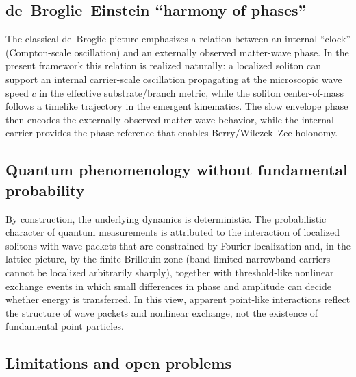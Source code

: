 \subsection{de~Broglie--Einstein ``harmony of phases''}

The classical de~Broglie picture emphasizes a relation between an internal ``clock'' (Compton-scale oscillation)
and an externally observed matter-wave phase.
In the present framework this relation is realized naturally: a localized soliton can support an internal carrier-scale
oscillation propagating at the microscopic wave speed $c$ in the effective substrate/branch metric, while the soliton
center-of-mass follows a timelike trajectory in the emergent kinematics.
The slow envelope phase then encodes the externally observed matter-wave behavior, while the internal carrier provides
the phase reference that enables Berry/Wilczek--Zee holonomy.

\subsection{Quantum phenomenology without fundamental probability}

By construction, the underlying dynamics is deterministic.
The probabilistic character of quantum measurements is attributed to the interaction of localized solitons with
wave packets that are constrained by Fourier localization and, in the lattice picture, by the finite Brillouin zone
(band-limited narrowband carriers cannot be localized arbitrarily sharply), together with threshold-like nonlinear exchange events in which small differences in phase and
amplitude can decide whether energy is transferred.
In this view, apparent point-like interactions reflect the structure of wave packets and nonlinear exchange,
not the existence of fundamental point particles.

\subsection{Limitations and open problems}

